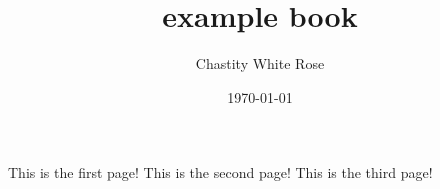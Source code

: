 \documentclass{book}
\title{example book}
\date{\today}
\author{Chastity White Rose}
\begin{document}
\maketitle
\newpage
This is the first page!
\newpage
This is the second page!
\newpage
This is the third page!
\end{document}
